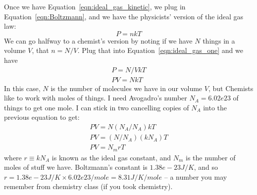 \documentclass[letterpaper,11pt,preprint]{aastex}
\begin{document}
Once we have Equation~\ref{eqn:ideal_gas_kinetic}, we plug in
Equation~\ref{eqn:Boltzmann}, and we have the physicists' version of
the ideal gas law:
\begin{equation}
  P=nkT
  \label{eqn:ideal_gas_one}
\end{equation}
We can go halfway to a chemist's version by noting if we have $N$
things in a volume $V$, that $n=N/V$.  Plug that into
Equation~\ref{eqn:ideal_gas_one} and we have
\begin{eqnarray}
  P=N/V kT\\
  PV=NkT
\end{eqnarray}
In this case, $N$ is the number of molecules we have in our volume
$V$, but Chemists like to work with moles of things.  I need
Avogadro's number $N_A=6.02e23$ of things to get one mole.  I can
stick in two cancelling copies of $N_A$ into the previous equation to
get:
\begin{eqnarray}
  PV=N (N_A/N_A)kT\\
  PV=(N/N_A) (kN_A)T\\
  PV=N_m rT
\end{eqnarray}
where $r\equiv kN_A$ is known as the ideal gas constant, and $N_m$ is
the number of moles of stuff we have.  Boltzmann's constant is
$1.38e-23 J/K$, and so $r=1.38e-23 J/K \times 6.02e23/mole = 8.31
J/K/mole$ -- a number you may remember from chemistry class (if you
took chemistry).
\end{document}
